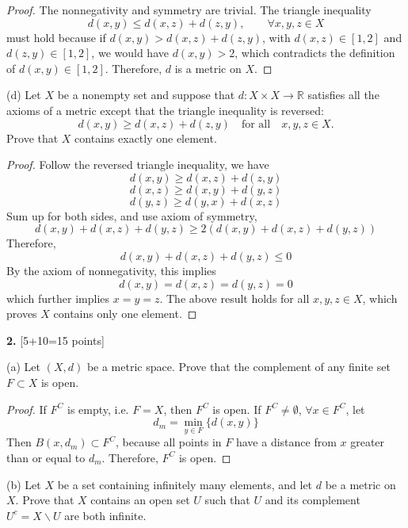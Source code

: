 \documentclass[11pt,a4paper]{amsart}
\def\R{{\mathbb R}}
\def\ra{\rightarrow}
\begin{document}
\begin{proof}
  The nonnegativity and symmetry are trivial. The triangle inequality
  $$d(x,y) \leq d(x,z) + d(z,y), \qquad\forall x,y,z \in X $$
  must hold because if $d(x,y) > d(x,z) + d(z,y)$, with $d(x,z) \in [1,2]$
  and $d(z,y) \in [1,2]$, we would have $d(x,y) > 2$, which contradicts the
  definition of $d(x,y) \in [1,2]$. Therefore, $d$ is a metric on $X$.
\end{proof}

\medskip

(d) Let $X$ be a nonempty set and suppose that $d:X\times X\ra \R$ satisfies all the axioms of
a metric except that the triangle inequality is reversed:
$$ d(x,y) \ge d(x,z)+d(z,y) \quad\mbox{for all}\quad x,y,z\in X. $$
Prove that $X$ contains exactly one element.

\begin{proof}
  Follow the reversed triangle inequality, we have
  $$ d(x,y) \ge d(x,z)+d(z,y) $$
  $$ d(x,z) \ge d(x,y)+d(y,z) $$
  $$ d(y,z) \ge d(y,x)+d(x,z) $$
  Sum up for both sides, and use axiom of symmetry,
  $$ d(x,y) + d(x,z) + d(y,z) \ge 2(d(x,y) + d(x,z) + d(y,z) )$$
  Therefore,
  $$ d(x,y) + d(x,z) + d(y,z) \le 0 $$
  By the axiom of nonnegativity, this implies
  $$ d(x,y) = d(x,z) = d(y,z) = 0 $$
  which further implies $x = y = z$.
  The above result holds for all $x,y,z\in X$, which proves
  $X$ contains only one element.
\end{proof}

\bigskip


{\bf 2.} [5+10=15 points]

(a) Let $(X,d)$ be a metric space. Prove that the complement of any finite set $F\subset X$
is open.

\begin{proof}
  If $F^C$ is empty, i.e. $F = X$, then $F^C$ is open.
  If $F^C \neq \emptyset$, $\forall x \in F^C$, let
  $$ d_m = \min_{y \in F} \{ d(x,y) \} $$
  Then $B(x, d_m) \subset F^C$, because all points in $F$ have a distance from $x$
  greater than or equal to $d_m$. Therefore, $F^C$ is open.
\end{proof}

\medskip

(b) Let $X$ be a  set containing infinitely many elements, and let $d$ be a metric on $X$.
Prove that $X$ contains an open set $U$ such that $U$ and its complement $U^c=X\backslash U$
are both infinite.
\end{document}
